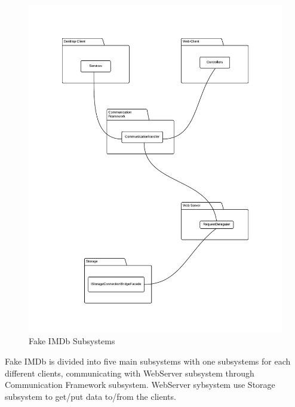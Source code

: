 \begin{figure}[H]
\includegraphics[scale=0.2]{img/SDD/FakeIMDbSubsystems.png}
\caption{Fake IMDb Subsystems}
\label{fig:FakeIMDBSubsystems}
\end{figure}

Fake IMDb is divided into five main subsystems with one subsystems for each different clients, communicating with WebServer subsystem through Communication Framework subsystem. WebServer sybsystem use Storage subsystem to get/put data to/from the clients.\\


